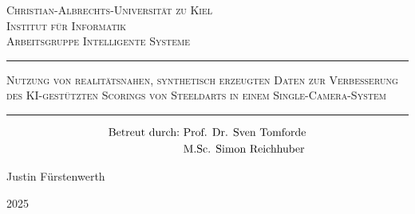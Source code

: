 
\begin{titlepage}
    \centering

    {\LARGE \scshape Christian-Albrechts-Universität zu Kiel}\\
    \vspace{0.25cm}
    {\large \scshape Institut für Informatik}\\
    \vspace{0.1cm}
    {\large \scshape Arbeitsgruppe Intelligente Systeme}



    \vfill

    {\Huge \scshape {}}

    \vspace{0.75cm}

    \hrule
    \vspace{0.5cm}
    {\LARGE \scshape Nutzung von realitätsnahen, synthetisch erzeugten}
    \vspace{0.15cm}
    {\LARGE \scshape Daten zur Verbesserung des KI-gestützten Scorings}
    \vspace{0.15cm}
    {\LARGE \scshape von Steeldarts in einem Single-Camera-System}
    \vspace{0.5cm}
    \hrule
    \begin{align*}
        \text{Betreut durch:} & \text{\,\,Prof. Dr. Sven Tomforde} \\
                              & \text{\,\,M.Sc. Simon Reichhuber}
    \end{align*}

    \vfill

    {\Large Justin Fürstenwerth}

    \vspace{0.2cm}

    {\large 2025}




\end{titlepage}
